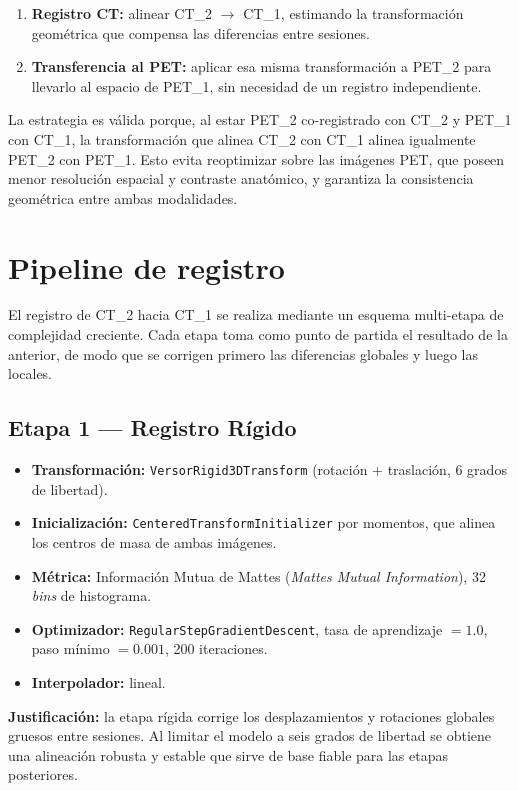 \documentclass[12pt, letterpaper]{article}
\begin{document}
\begin{enumerate}
    \item \textbf{Registro CT:} alinear CT\_2 $\rightarrow$ CT\_1, estimando la
    transformación geométrica que compensa las diferencias entre sesiones.
    \item \textbf{Transferencia al PET:} aplicar esa misma transformación a
    PET\_2 para llevarlo al espacio de PET\_1, sin necesidad de un registro
    independiente.
\end{enumerate}

La estrategia es válida porque, al estar PET\_2 co-registrado con CT\_2 y PET\_1
con CT\_1, la transformación que alinea CT\_2 con CT\_1 alinea igualmente PET\_2
con PET\_1. Esto evita reoptimizar sobre las imágenes PET, que poseen menor
resolución espacial y contraste anatómico, y garantiza la consistencia geométrica
entre ambas modalidades.

\section{Pipeline de registro}
El registro de CT\_2 hacia CT\_1 se realiza mediante un esquema multi-etapa de
complejidad creciente. Cada etapa toma como punto de partida el resultado de la
anterior, de modo que se corrigen primero las diferencias globales y luego las
locales.

\subsection{Etapa 1 — Registro Rígido}
\begin{itemize}
    \item \textbf{Transformación:} \texttt{VersorRigid3DTransform} (rotación +
    traslación, 6 grados de libertad).
    \item \textbf{Inicialización:} \texttt{CenteredTransformInitializer} por
    momentos, que alinea los centros de masa de ambas imágenes.
    \item \textbf{Métrica:} Información Mutua de Mattes (\textit{Mattes Mutual
    Information}), 32 \textit{bins} de histograma.
    \item \textbf{Optimizador:} \texttt{RegularStepGradientDescent}, tasa de
    aprendizaje $=1.0$, paso mínimo $=0.001$, 200 iteraciones.
    \item \textbf{Interpolador:} lineal.
\end{itemize}
\textbf{Justificación:} la etapa rígida corrige los desplazamientos y rotaciones
globales gruesos entre sesiones. Al limitar el modelo a seis grados de libertad
se obtiene una alineación robusta y estable que sirve de base fiable para las
etapas posteriores.
\end{document}
